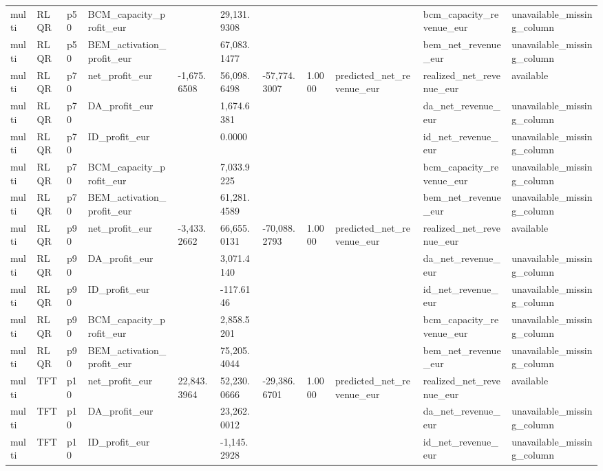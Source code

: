 \begin{table}[htbp]
\begin{tabular}{lllllllllll}
multi & RLQR & p50 & BCM\_capacity\_profit\_eur &  & 29,131.9308 &  &  &  & bcm\_capacity\_revenue\_eur & unavailable\_missing\_column \\
multi & RLQR & p50 & BEM\_activation\_profit\_eur &  & 67,083.1477 &  &  &  & bem\_net\_revenue\_eur & unavailable\_missing\_column \\
multi & RLQR & p70 & net\_profit\_eur & -1,675.6508 & 56,098.6498 & -57,774.3007 & 1.0000 & predicted\_net\_revenue\_eur & realized\_net\_revenue\_eur & available \\
multi & RLQR & p70 & DA\_profit\_eur &  & 1,674.6381 &  &  &  & da\_net\_revenue\_eur & unavailable\_missing\_column \\
multi & RLQR & p70 & ID\_profit\_eur &  & 0.0000 &  &  &  & id\_net\_revenue\_eur & unavailable\_missing\_column \\
multi & RLQR & p70 & BCM\_capacity\_profit\_eur &  & 7,033.9225 &  &  &  & bcm\_capacity\_revenue\_eur & unavailable\_missing\_column \\
multi & RLQR & p70 & BEM\_activation\_profit\_eur &  & 61,281.4589 &  &  &  & bem\_net\_revenue\_eur & unavailable\_missing\_column \\
multi & RLQR & p90 & net\_profit\_eur & -3,433.2662 & 66,655.0131 & -70,088.2793 & 1.0000 & predicted\_net\_revenue\_eur & realized\_net\_revenue\_eur & available \\
multi & RLQR & p90 & DA\_profit\_eur &  & 3,071.4140 &  &  &  & da\_net\_revenue\_eur & unavailable\_missing\_column \\
multi & RLQR & p90 & ID\_profit\_eur &  & -117.6146 &  &  &  & id\_net\_revenue\_eur & unavailable\_missing\_column \\
multi & RLQR & p90 & BCM\_capacity\_profit\_eur &  & 2,858.5201 &  &  &  & bcm\_capacity\_revenue\_eur & unavailable\_missing\_column \\
multi & RLQR & p90 & BEM\_activation\_profit\_eur &  & 75,205.4044 &  &  &  & bem\_net\_revenue\_eur & unavailable\_missing\_column \\
multi & TFT & p10 & net\_profit\_eur & 22,843.3964 & 52,230.0666 & -29,386.6701 & 1.0000 & predicted\_net\_revenue\_eur & realized\_net\_revenue\_eur & available \\
multi & TFT & p10 & DA\_profit\_eur &  & 23,262.0012 &  &  &  & da\_net\_revenue\_eur & unavailable\_missing\_column \\
multi & TFT & p10 & ID\_profit\_eur &  & -1,145.2928 &  &  &  & id\_net\_revenue\_eur & unavailable\_missing\_column \\

\end{tabular}
\end{table}

